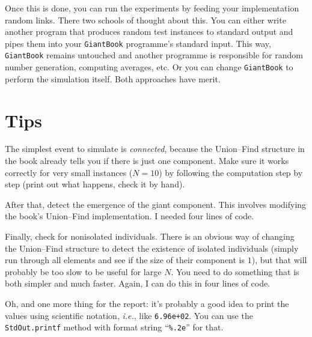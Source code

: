 \documentclass{tufte-handout}
\begin{document}
\medskip
Once this is done, you can run the experiments by feeding your implementation random links.
There two schools of thought about this.
You can either write another program that produces random test instances to standard output and pipes them into your \texttt{GiantBook} programme's standard input.
This way, \texttt{GiantBook} remains untouched and another programme is responsible for random number generation, computing averages, etc.
Or you can change \texttt{GiantBook} to perform the simulation itself.
Both approaches have merit.

\section{Tips}

The simplest event to simulate is \emph{connected}, because
the Union--Find structure in the book already tells you if there is
just one component.
Make sure it works correctly for very small instances ($N=10$) by
following the computation step by step (print out what happens, check
it by hand).

After that, detect the emergence of the giant component.
This involves modifying the book's Union--Find implementation.
I needed four lines of code.

Finally, check for nonisolated individuals.
There is an obvious way of changing the Union--Find structure to detect
the existence of isolated individuals (simply run through all elements
and see if the size of their component is $1$), but that will probably
be too slow to be useful for large $N$.
You need to do something that is both simpler and much faster.
Again, I can do this in four lines of code.

Oh, and one more thing for the report: it's probably a good idea to print the values
using scientific notation, \emph{i.e.}, like {\tt 6.96e+02}.
You can use the {\tt StdOut.printf} method with format string
``{\tt \%.2e}''  for that.
\end{document}

